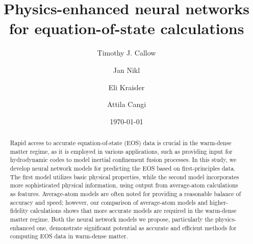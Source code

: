 \documentclass[%
 preprint,
 superscriptaddress,
 amsmath,amssymb,
longbibliography,
]{revtex4-2}
\begin{document}
\title{Physics-enhanced neural networks for equation-of-state calculations}

\author{Timothy J. Callow}

\author{Jan Nikl}

\author{Eli Kraisler}%


\author{Attila Cangi}







\date{\today}%

\begin{abstract}


Rapid access to accurate equation-of-state (EOS) data is crucial in the warm-dense matter regime, as it is employed in various applications, such as providing input for hydrodynamic codes to model inertial confinement fusion processes. In this study, we develop neural network models for predicting the EOS based on first-principles data. The first model utilizes basic physical properties, while the second model incorporates more sophisticated physical information, using output from average-atom calculations as features. Average-atom models are often noted for providing a reasonable balance of accuracy and speed; however, our comparison of average-atom models and higher-fidelity calculations shows that more accurate models are required in the warm-dense matter regime. Both the neural network models we propose, particularly the physics-enhanced one, demonstrate significant potential as accurate and efficient methods for computing EOS data in warm-dense matter. 

\end{abstract}

\maketitle
\end{document}
